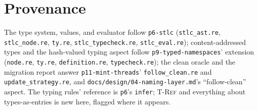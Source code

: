 \documentclass[11pt]{article}
\theoremstyle{definition}
\theoremstyle{plain}
\theoremstyle{remark}
\begin{document}
\section*{Provenance}
The type system, values, and evaluator follow
\texttt{p6-stlc} (\texttt{stlc\_ast.re}, \texttt{stlc\_node.re}, \texttt{ty.re},
\texttt{stlc\_typecheck.re}, \texttt{stlc\_eval.re}); content-addressed types and the
hash-valued typing aspect follow \texttt{p9-typed-namespaces}' extension
(\texttt{node.re}, \texttt{ty.re}, \texttt{definition.re}, \texttt{typecheck.re}); the
clean oracle and the migration report answer \texttt{p11-mint-threads}'
\texttt{follow\_clean.re} and \texttt{update\_strategy.re}, and
\texttt{docs/design/04-naming-layer.md}'s ``follow-clean'' aspect. The typing rules'
reference is \texttt{p6}'s \texttt{infer}; \textsc{T-Ref} and everything about
types-as-entries is new here, flagged where it appears.
\end{document}

